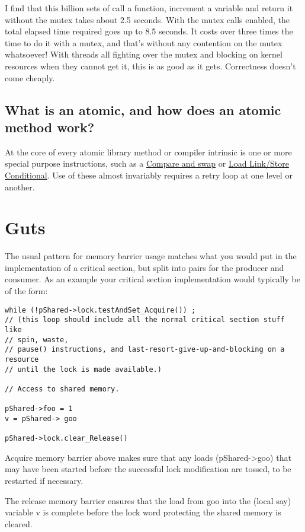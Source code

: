 I find that this billion sets of call a function, increment a variable and return it without the mutex takes about 2.5 seconds.  With the mutex calls enabled, the total elapsed time required goes up to 8.5 seconds.  It costs over three times the time to do it with a mutex, and that's without any contention on the mutex whatsoever!  With threads all fighting over the mutex and blocking on kernel resources when they cannot get it, this is as good as it gets.  Correctness doesn't come cheaply.

\subsection{What is an atomic, and how does an atomic method work?}

At the core of every atomic library method or compiler intrinsic is one or more special purpose instructions, such as a \href{http://en.wikipedia.org/wiki/Compare-and-swap}{Compare and swap} or \href{http://en.wikipedia.org/wiki/Load-Link/Store-Conditional}{Load Link/Store Conditional}.  Use of these almost invariably requires a retry loop at one level or another.

\section{Guts}

The usual pattern for memory barrier usage matches what you would put in the implementation of a critical section, but split into pairs for the producer and consumer. As an example your critical section implementation would typically be of the form:

\begin{lstlisting}
while (!pShared->lock.testAndSet_Acquire()) ;
// (this loop should include all the normal critical section stuff like
// spin, waste, 
// pause() instructions, and last-resort-give-up-and-blocking on a resource 
// until the lock is made available.)

// Access to shared memory.

pShared->foo = 1 
v = pShared-> goo

pShared->lock.clear_Release()
\end{lstlisting}

Acquire memory barrier above makes sure that any loads (pShared->goo) that may have been started before the successful lock modification are tossed, to be restarted if necessary.

The release memory barrier ensures that the load from goo into the (local say) variable v is complete before the lock word protecting the shared memory is cleared.

